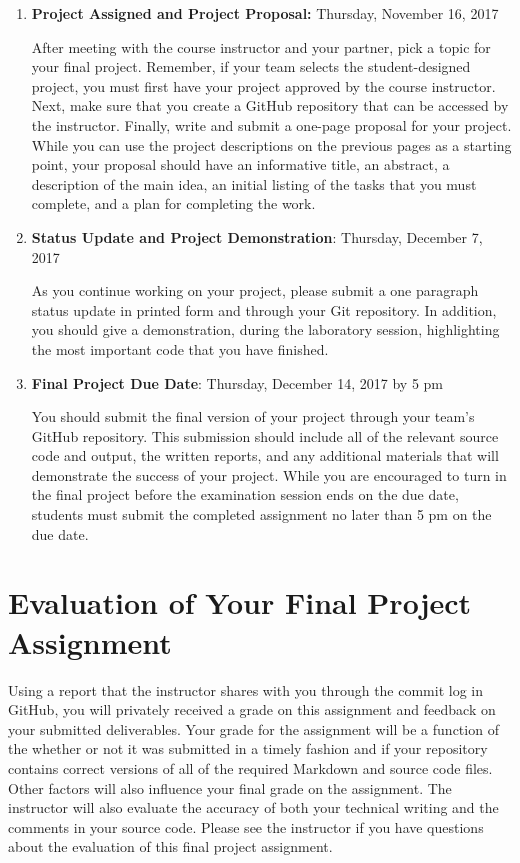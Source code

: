 \documentclass[11pt]{article}
\begin{document}
\begin{enumerate}

  \item {\bf Project Assigned and Project Proposal:} Thursday, November 16, 2017

    After meeting with the course instructor and your partner, pick a topic for your final project. Remember, if your
    team selects the student-designed project, you must first have your project approved by the course instructor. Next,
    make sure that you create a GitHub repository that can be accessed by the instructor. Finally, write and submit a
    one-page proposal for your project. While you can use the project descriptions on the previous pages as a starting
    point, your proposal should have an informative title, an abstract, a description of the main idea, an initial
    listing of the tasks that you must complete, and a plan for completing the work.

  \item {\bf Status Update and Project Demonstration}: Thursday, December 7, 2017

    As you continue working on your project, please submit a one paragraph status update in printed form and through
    your Git repository. In addition, you should give a demonstration, during the laboratory session, highlighting the
    most important code that you have finished.

  \item {\bf Final Project Due Date}: Thursday, December 14, 2017 by 5 pm

    You should submit the final version of your project through your team's GitHub repository. This submission should
    include all of the relevant source code and output, the written reports, and any additional materials that will
    demonstrate the success of your project. While you are encouraged to turn in the final project before the
    examination session ends on the due date, students must submit the completed assignment no later than 5 pm on the
    due date.

\end{enumerate}

\section*{Evaluation of Your Final Project Assignment}

Using a report that the instructor shares with you through the commit log in GitHub, you will privately received a grade
on this assignment and feedback on your submitted deliverables. Your grade for the assignment will be a function of the
whether or not it was submitted in a timely fashion and if your repository contains correct versions of all of the
required Markdown and source code files. Other factors will also influence your final grade on the assignment. The
instructor will also evaluate the accuracy of both your technical writing and the comments in your source code. Please
see the instructor if you have questions about the evaluation of this final project assignment.
\end{document}
